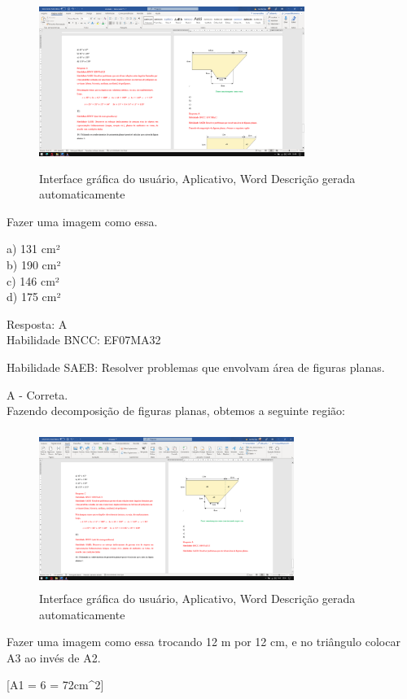 \begin{figure}
\centering
\includegraphics[width=3.39583in,height=2.1875in]{./imgSAEB_7_MAT/media/image111.png}
\caption{Interface gráfica do usuário, Aplicativo, Word Descrição gerada
automaticamente}
\end{figure}

Fazer uma imagem como essa.

a) 131 cm²\\
b) 190 cm²\\
c) 146 cm²\\
d) 175 cm²

Resposta: A\\
Habilidade BNCC: EF07MA32

Habilidade SAEB: Resolver problemas que envolvam área de figuras planas.

A - Correta.\\
Fazendo decomposição de figuras planas, obtemos a seguinte região:

\begin{figure}
\centering
\includegraphics[width=3.25677in,height=2.00772in]{./imgSAEB_7_MAT/media/image112.png}
\caption{Interface gráfica do usuário, Aplicativo, Word Descrição gerada
automaticamente}
\end{figure}

Fazer uma imagem como essa trocando 12 m por 12 cm, e no triângulo
colocar A3 ao invés de A2.

[A1 = 6  = 72cm^{2}]

